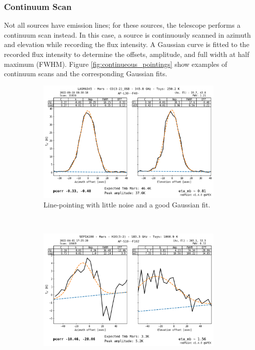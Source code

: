 \subsubsection{Continuum Scan}
Not all sources have emission lines; for these sources, the telescope performs a continuum scan instead. In this case, a source is continuously scanned in azimuth and elevation while recording the flux intensity.
A Gaussian curve is fitted to the recorded flux intensity to determine the offsets, amplitude, and full width at half maximum (FWHM).
Figure \ref{fig:continueous_pointings} show examples of continuum scans and the corresponding Gaussian fits.

\begin{figure}[H]
    \centering
     \begin{subfigure}[b]{0.75\textwidth}
         \centering
         \includegraphics[width=\textwidth]{Pointing Scans/good_continuous.png}
         \caption{Line-pointing with little noise and a good Gaussian fit.}
         \label{subfig:good_continuous}
     \end{subfigure}
    \\
     \begin{subfigure}[b]{0.75\textwidth}
         \centering
         \includegraphics[width=\textwidth]{Pointing Scans/bad_continuous.png}

\end{subfigure}
\end{figure}
